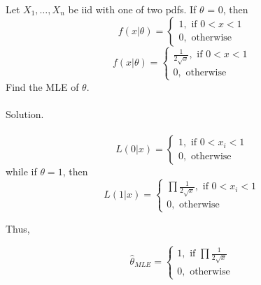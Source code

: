 \documentclass[11pt,fleqn]{book} %
\begin{document}
	\begin{problem} Let $X_1, \dots, X_n$ be iid with one of two pdfs. If $\theta$ = 0, then
	$$ f(x|\theta) = \begin{cases} 1,\text{ if } 0<x<1 \\ 0, \text{ otherwise} \end{cases}$$
	$$ f(x|\theta) = \begin{cases} \frac{1}{2\sqrt{x}},\text{ if } 0<x<1 \\ 0, \text{ otherwise} \end{cases}$$
	Find the MLE of $\theta$.\\
	\\

	Solution.\\
	\\
	$$ L(0|x) = \begin{cases} 1,\text{ if } 0<x_i<1 \\ 0, \text{ otherwise} \end{cases}$$
	while if $\theta=1$, then
	$$ L(1|x) = \begin{cases} \prod \frac{1}{2\sqrt{x}},\text{ if } 0<x_i<1 \\ 0, \text{ otherwise} \end{cases}$$

	Thus, 

	$$\hat{\theta}_{MLE} = \begin{cases} 1,\text{ if } \prod \frac{1}{2\sqrt{x}}\ \\ 0, \text{ otherwise} \end{cases} $$
		
	\end{problem}







\end{document}
